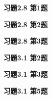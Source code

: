 \renewcommand{\newpageorvspace}{\vspace{2em}}

\date{第刘次作业}



\maketitle

{\bf 习题2.8 第1题}

\newpageorvspace

{\bf 习题2.8 第2题}

\newpageorvspace

{\bf 习题2.8 第3题}

\newpageorvspace

{\bf 习题3.1 第2题}

\newpageorvspace

{\bf 习题3.1 第3题}

\newpageorvspace

{\bf 习题3.1 第5题}

\newpageorvspace


